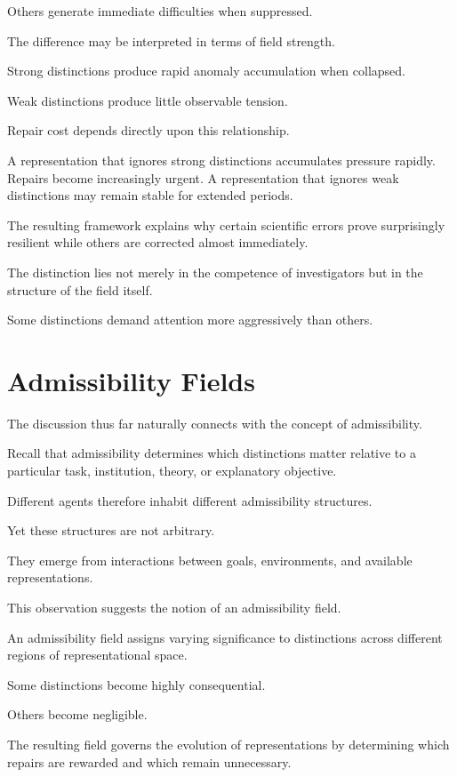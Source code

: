 \documentclass[11pt,oneside,openany]{book}
\begin{document}
Others generate immediate difficulties when suppressed.

The difference may be interpreted in terms of field strength.

Strong distinctions produce rapid anomaly accumulation when collapsed.

Weak distinctions produce little observable tension.

Repair cost depends directly upon this relationship.

A representation that ignores strong distinctions accumulates pressure rapidly. Repairs become increasingly urgent. A representation that ignores weak distinctions may remain stable for extended periods.

The resulting framework explains why certain scientific errors prove surprisingly resilient while others are corrected almost immediately.

The distinction lies not merely in the competence of investigators but in the structure of the field itself.

Some distinctions demand attention more aggressively than others.

\section{Admissibility Fields}

The discussion thus far naturally connects with the concept of admissibility.

Recall that admissibility determines which distinctions matter relative to a particular task, institution, theory, or explanatory objective.

Different agents therefore inhabit different admissibility structures.

Yet these structures are not arbitrary.

They emerge from interactions between goals, environments, and available representations.

This observation suggests the notion of an admissibility field.

An admissibility field assigns varying significance to distinctions across different regions of representational space.

Some distinctions become highly consequential.

Others become negligible.

The resulting field governs the evolution of representations by determining which repairs are rewarded and which remain unnecessary.
\end{document}

